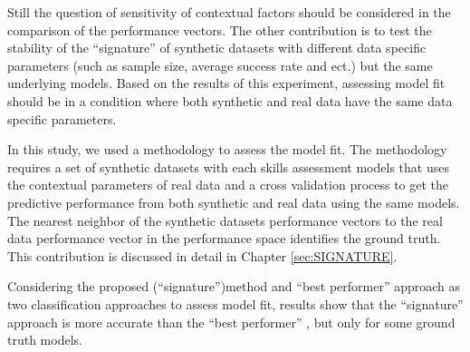 Still the question of sensitivity of contextual factors should be considered in the comparison of the performance vectors. The other contribution is to test the stability of the ``signature'' of synthetic datasets with different data specific parameters (such as sample size, average success rate and ect.) but the same underlying models. Based on the results of this experiment, assessing model fit should be in a condition where both synthetic and real data have the same data specific parameters.

In this study, we used a methodology to assess the model fit. The methodology requires a set of synthetic datasets with each skills assessment models that uses the contextual parameters of real data and a cross validation process to get the predictive performance from both synthetic and real data using the same models. The nearest neighbor of the synthetic datasets performance vectors to the real data performance vector in the performance space identifies the ground truth. This contribution is discussed in detail in Chapter \ref{sec:SIGNATURE}.

Considering the proposed (``signature'')method  and ``best performer'' approach as two classification approaches to assess model fit, results show that the ``signature'' approach is more accurate than the ``best performer'' , but only for some ground truth models. 


